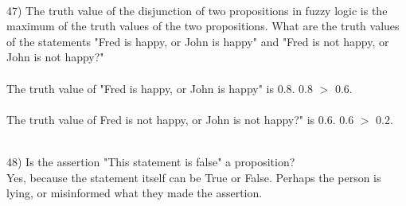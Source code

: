 \documentclass{article}
\begin{document}
\begin{flushleft}
~\\\setlength\parindent{0pt}47) The truth value of the disjunction of two propositions in fuzzy logic is the maximum of the truth values of the two propositions.  What are the truth values of the statements "Fred is happy, or John is happy" and "Fred is not happy, or John is not happy?"\\
~\\
The truth value of "Fred is happy, or John is happy" is 0.8.  0.8 $>$ 0.6.\\
~\\The truth value of Fred is not happy, or John is not happy?" is 0.6.  0.6 $>$ 0.2.

~\\\setlength\parindent{0pt}48) Is the assertion "This statement is false" a proposition? \\ 
Yes, because the statement itself can be True or False.  Perhaps the person is lying, or misinformed what they made the assertion.\\

\end{flushleft}
\end{document}
